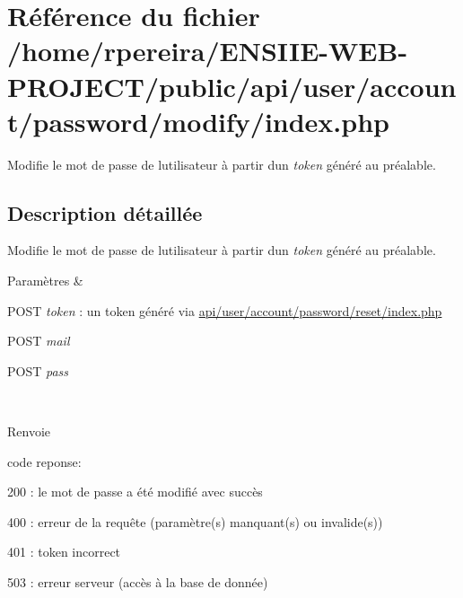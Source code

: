 \hypertarget{account_2password_2modify_2index_8php}{}\section{Référence du fichier /home/rpereira/\+E\+N\+S\+I\+I\+E-\/\+W\+E\+B-\/\+P\+R\+O\+J\+E\+C\+T/public/api/user/account/password/modify/index.php}
\label{account_2password_2modify_2index_8php}


Modifie le mot de passe de l\textquotesingle{}utilisateur à partir d\textquotesingle{}un {\itshape token} généré au préalable.  




\subsection{Description détaillée}
Modifie le mot de passe de l\textquotesingle{}utilisateur à partir d\textquotesingle{}un {\itshape token} généré au préalable. 


\begin{DoxyParams}{Paramètres}
{\em } & 
\begin{DoxyItemize}
\item P\+O\+ST {\itshape token} \+: un token généré via \hyperlink{account_2password_2reset_2index_8php}{api/user/account/password/reset/index.\+php}
\item P\+O\+ST {\itshape mail} 
\item P\+O\+ST {\itshape pass} 
\end{DoxyItemize}\\
\hline
\end{DoxyParams}
\begin{DoxyReturn}{Renvoie}

\begin{DoxyItemize}
\item code reponse\+:
\begin{DoxyItemize}
\item 200 \+: le mot de passe a été modifié avec succès
\item 400 \+: erreur de la requête (paramètre(s) manquant(s) ou invalide(s))
\item 401 \+: token incorrect
\item 503 \+: erreur serveur (accès à la base de donnée) 
\end{DoxyItemize}
\end{DoxyItemize}
\end{DoxyReturn}
